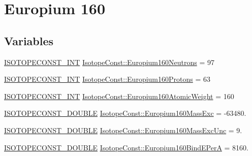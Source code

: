 \hypertarget{group___isotope_const-_europium-_eu160}{}\section{Europium 160}
\label{group___isotope_const-_europium-_eu160}
\subsection*{Variables}
\begin{DoxyCompactItemize}
\item 
\mbox{\hyperlink{group___isotope_const-_macros_ga5f18360b3e99483a35c32d789e62621c}{I\+S\+O\+T\+O\+P\+E\+C\+O\+N\+S\+T\+\_\+\+I\+NT}} \mbox{\hyperlink{group___isotope_const-_europium-_eu160_ga140d065efbaf07a8faa67bf0ef583b1e}{Isotope\+Const\+::\+Europium160\+Neutrons}} = 97
\item 
\mbox{\hyperlink{group___isotope_const-_macros_ga5f18360b3e99483a35c32d789e62621c}{I\+S\+O\+T\+O\+P\+E\+C\+O\+N\+S\+T\+\_\+\+I\+NT}} \mbox{\hyperlink{group___isotope_const-_europium-_eu160_ga654aea63b4bae0dfd066ffa0ee0a7ff9}{Isotope\+Const\+::\+Europium160\+Protons}} = 63
\item 
\mbox{\hyperlink{group___isotope_const-_macros_ga5f18360b3e99483a35c32d789e62621c}{I\+S\+O\+T\+O\+P\+E\+C\+O\+N\+S\+T\+\_\+\+I\+NT}} \mbox{\hyperlink{group___isotope_const-_europium-_eu160_gac65b755056b96d823ca21ff8f269c2b3}{Isotope\+Const\+::\+Europium160\+Atomic\+Weight}} = 160
\item 
\mbox{\hyperlink{group___isotope_const-_macros_ga8f45a7272ce02c0b4c65c44636ed719a}{I\+S\+O\+T\+O\+P\+E\+C\+O\+N\+S\+T\+\_\+\+D\+O\+U\+B\+LE}} \mbox{\hyperlink{group___isotope_const-_europium-_eu160_gad73266ce5477ea98d54b1948aa5d7c52}{Isotope\+Const\+::\+Europium160\+Mass\+Exc}} = -\/63480.
\item 
\mbox{\hyperlink{group___isotope_const-_macros_ga8f45a7272ce02c0b4c65c44636ed719a}{I\+S\+O\+T\+O\+P\+E\+C\+O\+N\+S\+T\+\_\+\+D\+O\+U\+B\+LE}} \mbox{\hyperlink{group___isotope_const-_europium-_eu160_ga6cf6d4423a75133d5915aa6b0a19ddfb}{Isotope\+Const\+::\+Europium160\+Mass\+Exc\+Unc}} = 9.
\item 
\mbox{\hyperlink{group___isotope_const-_macros_ga8f45a7272ce02c0b4c65c44636ed719a}{I\+S\+O\+T\+O\+P\+E\+C\+O\+N\+S\+T\+\_\+\+D\+O\+U\+B\+LE}} \mbox{\hyperlink{group___isotope_const-_europium-_eu160_gaee0c031f480b970e56ead3f96b80203e}{Isotope\+Const\+::\+Europium160\+Bind\+E\+PerA}} = 8160.
\item 

\end{DoxyCompactItemize}
